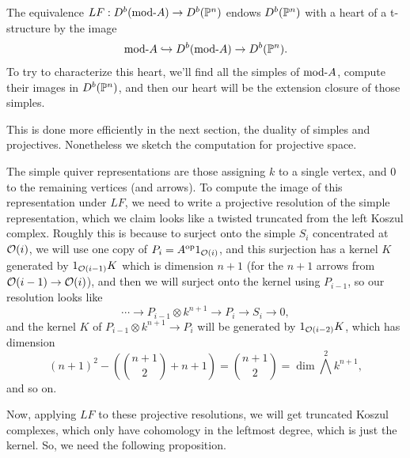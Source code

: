 \documentclass[12pt]{article}
\begin{document}
The equivalence $LF: D^b(\rmod A) \to D^b(\P^n)$ endows $D^b(\P^n)$ with a heart of a t-structure by the image
\[\rmod A \hookrightarrow D^b(\rmod A) \to D^b(\P^n).\]
To try to characterize this heart, we'll find all the simples of $\rmod A$, compute their images in $D^b(\P^n)$, and then our heart will be the extension closure of those simples.

This is done more efficiently in the next section, the duality of simples and projectives. Nonetheless we sketch the computation for projective space.

The simple quiver representations are those assigning $k$ to a single vertex, and $0$ to the remaining vertices (and arrows). To compute the image of this representation under $LF$, we need to write a projective resolution of the simple representation, which we claim looks like a twisted truncated from the left Koszul complex. Roughly this is because to surject onto the simple $S_i$ concentrated at $\cO(i)$, we will use one copy of $P_i = A^\op 1_{\cO(i)}$, and this surjection has a kernel $K$ generated by $1_{\cO(i-1)}K$ which is dimension $n+1$ (for the $n+1$ arrows from $\cO(i-1)\to \cO(i)$), and then we will surject onto the kernel using $P_{i-1}$, so our resolution looks like
\[\cdots \to P_{i-1} \otimes k^{n+1} \to P_i \to S_i \to 0,\]
and the kernel $K$ of $P_{i-1} \otimes k^{n+1} \to P_i$ will be generated by $1_{\cO(i-2)} K$, which has dimension 
\[(n+1)^2 - (\binom{n+1}{2} + n+1) = \binom{n+1}{2} = \dim \bigwedge^2 k^{n+1},\]
and so on.

Now, applying $LF$ to these projective resolutions, we will get truncated Koszul complexes, which only have cohomology in the leftmost degree, which is just the kernel. So, we need the following proposition.
\end{document}
